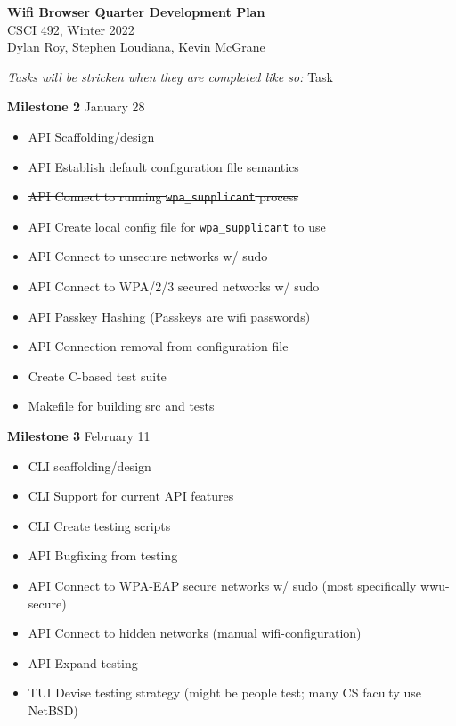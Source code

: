 \documentclass[11pt]{article}
\begin{document}
\begin{center}
  \textbf{\Large Wifi Browser Quarter Development Plan}\\\large CSCI 492, Winter 2022\\
  Dylan Roy, Stephen Loudiana, Kevin McGrane
\end{center}


\textit{Tasks will be stricken when they are completed like so:} \sout{Task}

\textbf{Milestone 2} January 28
\begin{itemize}
  \item API Scaffolding/design
  \item API Establish default configuration file semantics
  \item \sout{API Connect to running \texttt{wpa\_supplicant} process}
  \item API Create local config file for \texttt{wpa\_supplicant} to use
  \item API Connect to unsecure networks w/ sudo
  \item API Connect to WPA/2/3 secured networks w/ sudo
  \item API Passkey Hashing (Passkeys are wifi passwords)
  \item API Connection removal from configuration file
  \item Create C-based test suite
  \item Makefile for building src and tests
\end{itemize}

\textbf{Milestone 3} February 11
\begin{itemize}
  \item CLI scaffolding/design
  \item CLI Support for current API features
  \item CLI Create testing scripts
  \item API Bugfixing from testing
  \item API Connect to WPA-EAP secure networks w/ sudo (most specifically wwu-secure)
  \item API Connect to hidden networks (manual wifi-configuration)
  \item API Expand testing
  \item TUI Devise testing strategy (might be people test; many CS faculty use NetBSD)
\end{itemize}
\end{document}
